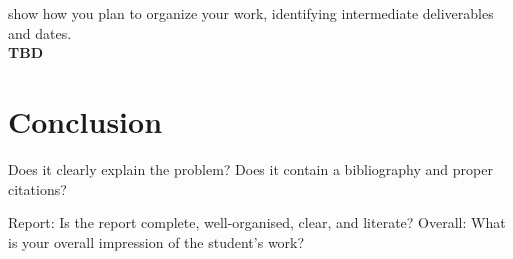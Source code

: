 \documentclass{mprop}
\begin{document}
show how you plan to organize your work, identifying intermediate deliverables and dates.\\
\textbf{TBD}

\section{Conclusion}

Does it clearly explain the problem? 
Does it contain a bibliography and proper citations?

Report: Is the report complete, well-organised, clear, and literate? 
Overall: What is your overall impression of the student’s work?



\end{document}
